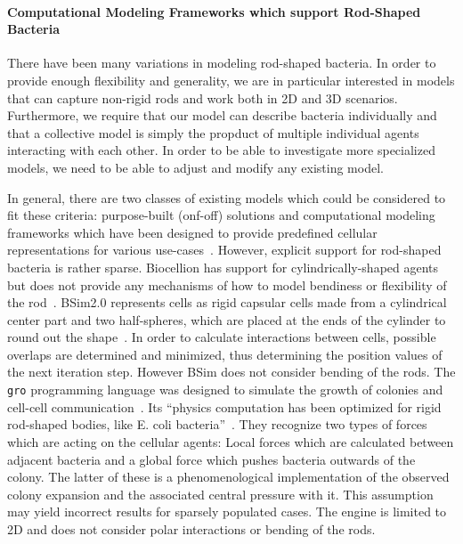 \documentclass{article}
\begin{document}
\paragraph{Computational Modeling Frameworks which support Rod-Shaped Bacteria}
There have been many variations in modeling rod-shaped bacteria.
In order to provide enough flexibility and generality, we are in particular interested in models
that can capture non-rigid rods and work both in 2D and 3D scenarios.
Furthermore, we require that our model can describe bacteria individually and that a collective
model is simply the propduct of multiple individual agents interacting with each other.
In order to be able to investigate more specialized models, we need to be able to adjust and modify
any existing model.

In general, there are two classes of existing models which could be considered to fit these
criteria: purpose-built (onf-off) solutions and computational modeling frameworks which have been
designed to provide predefined cellular representations for various use-cases~\cite{Pleyer2023}.
However, explicit support for rod-shaped bacteria is rather sparse.
Biocellion has support for cylindrically-shaped agents but does not provide any mechanisms of how to
model bendiness or flexibility of the rod~\cite{Kang2014}.
BSim2.0 represents cells as rigid capsular cells made from a cylindrical center part and two
half-spheres, which are placed at the ends of the cylinder to round out the
shape~\cite{Matyjaszkiewicz2017}.
In order to calculate interactions between cells, possible overlaps are determined and minimized,
thus determining the position values of the next iteration step.
However BSim does not consider bending of the rods.
The \texttt{gro} programming language was designed to simulate the growth of colonies and cell-cell
communication~\cite{Gutirrez2017}.
Its “physics computation has been optimized for rigid rod-shaped bodies, like E. coli
bacteria”~\cite{Gutirrez2017}.
They recognize two types of forces which are acting on the cellular agents:
Local forces which are calculated between adjacent bacteria and a global force which pushes bacteria
outwards of the colony.
The latter of these is a phenomenological implementation of the observed colony expansion and the
associated central pressure with it.
This assumption may yield incorrect results for sparsely populated cases.
The engine is limited to 2D and does not consider polar interactions or bending of the rods.
\end{document}
